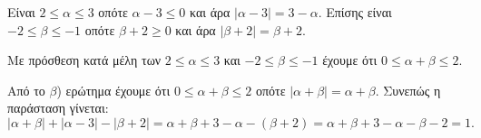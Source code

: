
\begin{alist}
\item Είναι $2 \le \alpha \le 3$ οπότε $\alpha - 3 \le 0$ και άρα $|\alpha - 3| = 3 - \alpha$.
Επίσης είναι $-2 \le \beta \le -1$ οπότε $\beta + 2 \ge 0$ και άρα $|\beta + 2| = \beta + 2$.

\item Με πρόσθεση κατά μέλη των $2 \le \alpha \le 3$ και $-2 \le \beta \le -1$ έχουμε ότι $0 \le \alpha + \beta \le 2$.

\item Από το $\beta$) ερώτημα έχουμε ότι $0 \le \alpha + \beta \le 2$ οπότε $|\alpha + \beta| = \alpha + \beta$.
Συνεπώς η παράσταση γίνεται:
\[|\alpha + \beta| + |\alpha - 3| - |\beta + 2| = \alpha + \beta + 3 - \alpha - (\beta + 2) = \alpha + \beta + 3 - \alpha - \beta - 2 = 1.\]
\end{alist}

